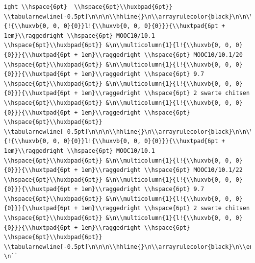 \documentclass[11pt,preprint, authoryear]{elsarticle}
\numberwithin{equation}{section}
\numberwithin{figure}{section}
\numberwithin{table}{section}
\begin{document}
\begin{verbatim}
ight \\hspace{6pt}  \\hspace{6pt}\\huxbpad{6pt}} \\tabularnewline[-0.5pt]\n\n\n\\hhline{}\n\\arrayrulecolor{black}\n\n\\multicolumn{1}{!{\\huxvb{0, 0, 0}{0}}l!{\\huxvb{0, 0, 0}{0}}}{\\huxtpad{6pt + 1em}\\raggedright \\hspace{6pt} MOOC10/10.1 \\hspace{6pt}\\huxbpad{6pt}} &\n\\multicolumn{1}{l!{\\huxvb{0, 0, 0}{0}}}{\\huxtpad{6pt + 1em}\\raggedright \\hspace{6pt} MOOC10/10.1/20 \\hspace{6pt}\\huxbpad{6pt}} &\n\\multicolumn{1}{l!{\\huxvb{0, 0, 0}{0}}}{\\huxtpad{6pt + 1em}\\raggedright \\hspace{6pt} 9.7 \\hspace{6pt}\\huxbpad{6pt}} &\n\\multicolumn{1}{l!{\\huxvb{0, 0, 0}{0}}}{\\huxtpad{6pt + 1em}\\raggedright \\hspace{6pt} 2 swarte chitsen \\hspace{6pt}\\huxbpad{6pt}} &\n\\multicolumn{1}{l!{\\huxvb{0, 0, 0}{0}}}{\\huxtpad{6pt + 1em}\\raggedright \\hspace{6pt}  \\hspace{6pt}\\huxbpad{6pt}} \\tabularnewline[-0.5pt]\n\n\n\\hhline{}\n\\arrayrulecolor{black}\n\n\\multicolumn{1}{!{\\huxvb{0, 0, 0}{0}}l!{\\huxvb{0, 0, 0}{0}}}{\\huxtpad{6pt + 1em}\\raggedright \\hspace{6pt} MOOC10/10.1 \\hspace{6pt}\\huxbpad{6pt}} &\n\\multicolumn{1}{l!{\\huxvb{0, 0, 0}{0}}}{\\huxtpad{6pt + 1em}\\raggedright \\hspace{6pt} MOOC10/10.1/22 \\hspace{6pt}\\huxbpad{6pt}} &\n\\multicolumn{1}{l!{\\huxvb{0, 0, 0}{0}}}{\\huxtpad{6pt + 1em}\\raggedright \\hspace{6pt} 9.7 \\hspace{6pt}\\huxbpad{6pt}} &\n\\multicolumn{1}{l!{\\huxvb{0, 0, 0}{0}}}{\\huxtpad{6pt + 1em}\\raggedright \\hspace{6pt} 2 swarte chitsen \\hspace{6pt}\\huxbpad{6pt}} &\n\\multicolumn{1}{l!{\\huxvb{0, 0, 0}{0}}}{\\huxtpad{6pt + 1em}\\raggedright \\hspace{6pt}  \\hspace{6pt}\\huxbpad{6pt}} \\tabularnewline[-0.5pt]\n\n\n\\hhline{}\n\\arrayrulecolor{black}\n\\end{tabular}\n\\end{threeparttable}\\par\\end{centerbox}\n\n\\end{table}\n \n``
\end{verbatim}
\end{document}
